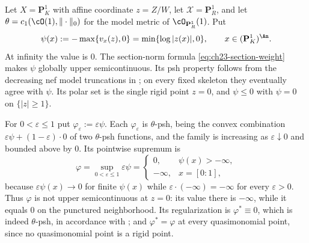 \begin{example}
\label{ex:ch23-sup-not-usc}
Let $X=\mathbf P^1_K$ with affine coordinate $z=Z/W$, let
$\mathcal X=\mathbf P^1_R$, and let $\theta=c_1(\cO(1),\|\cdot\|_0)$ for
the model metric of $\cO_{\mathbf P^1_R}(1)$.  Put
\begin{equation}\label{eq:ch23-log-pole-potential}
 \psi(x):=-\max\{v_x(z),0\}
 =\min\{\log|z(x)|,0\},
 \qquad x\in(\mathbf P^1_K)^{\An}.
\end{equation}
At infinity the value is $0$.  The section-norm formula
\eqref{eq:ch23-section-weight} makes $\psi$ globally upper
semicontinuous.  Its psh property follows from the decreasing nef model
truncations in ; on every fixed skeleton
they eventually agree with $\psi$.  Its polar set is the single rigid point
$z=0$, and $\psi\leq0$ with $\psi=0$ on $\{|z|\geq1\}$.

For $0<\varepsilon\leq1$ put $\varphi_\varepsilon:=\varepsilon\psi$.
Each $\varphi_\varepsilon$ is $\theta$-psh, being the convex combination
$\varepsilon\psi+(1-\varepsilon)\cdot0$ of two $\theta$-psh functions,
and the family is increasing as $\varepsilon\downarrow0$ and bounded above
by $0$.  Its pointwise supremum is
\[
 \varphi=\sup_{0<\varepsilon\leq1}\varepsilon\psi
 =\begin{cases}
   0,&\psi(x)>-\infty,\\
   -\infty,&x=[0:1],
 \end{cases}
\]
because $\varepsilon\psi(x)\to0$ for finite $\psi(x)$ while
$\varepsilon\cdot(-\infty)=-\infty$ for every $\varepsilon>0$.  Thus
$\varphi$ is not upper semicontinuous at $z=0$: its value there is
$-\infty$, while it equals $0$ on the punctured neighborhood.  Its
regularization is $\varphi^*\equiv0$, which is indeed $\theta$-psh, in
accordance with ; and $\varphi^*=\varphi$ at
every quasimonomial point, since no quasimonomial point is a rigid point.
\end{example}

